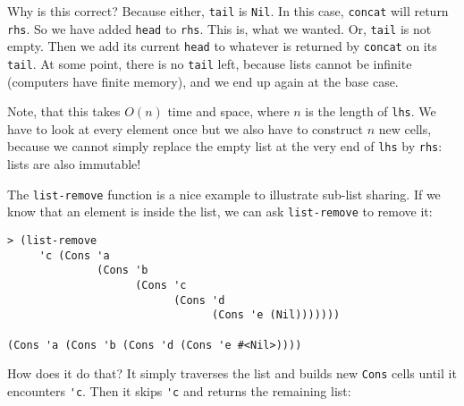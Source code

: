 \documentclass{article}
\begin{document}
Why is this correct? Because either, \lstinline{tail} is \lstinline{Nil}. In this case, \lstinline{concat} will return \lstinline{rhs}. So we have added \lstinline{head} to \lstinline{rhs}. This is, what we wanted. Or, \lstinline{tail} is not empty. Then we add its current \lstinline{head} to whatever is returned by \lstinline{concat} on its \lstinline{tail}. At some point, there is no \lstinline{tail} left, because lists cannot be infinite (computers have finite memory), and we end up again at the base case.

Note, that this takes $O(n)$ time and space, where $n$ is the length of \lstinline{lhs}. We have to look at every element once but we also have to construct $n$ new cells, because we cannot simply replace the empty list at the very end of \lstinline{lhs} by \lstinline{rhs}: lists are also immutable!

The \lstinline{list-remove} function is a nice example to illustrate sub-list sharing. If we know that an element is inside the list, we can ask \lstinline{list-remove} to remove it:

\begin{lstlisting}
> (list-remove
     'c (Cons 'a
              (Cons 'b
                    (Cons 'c
                          (Cons 'd
                                (Cons 'e (Nil)))))))

(Cons 'a (Cons 'b (Cons 'd (Cons 'e #<Nil>))))
\end{lstlisting}

How does it do that? It simply traverses the list and builds new \lstinline{Cons} cells until it encounters \lstinline{'c}. Then it skips \lstinline{'c} and returns the remaining list:

\vspace{1cm}


\end{document}
